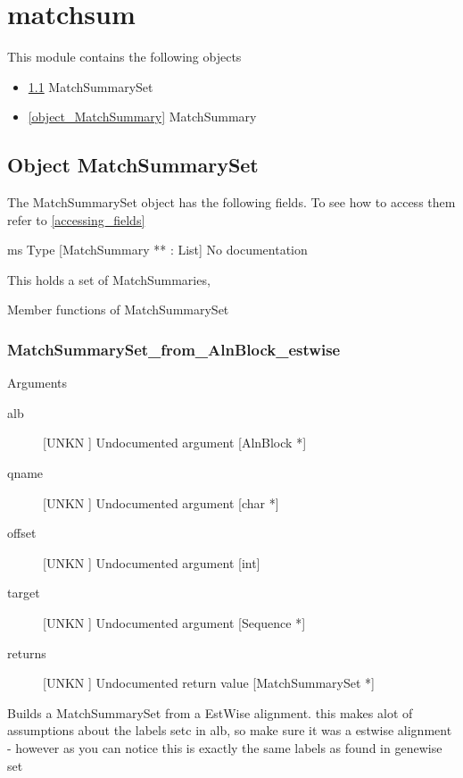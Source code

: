\section{matchsum}
\label{module_matchsum}
This module contains the following objects

\begin{itemize}
\item \ref{object_MatchSummarySet} MatchSummarySet

\item \ref{object_MatchSummary} MatchSummary

\end{itemize}
\subsection{Object MatchSummarySet}

\label{object_MatchSummarySet}

The MatchSummarySet object has the following fields. To see how to access them refer to \ref{accessing_fields}
\begin{description}
\item{ms} Type [MatchSummary ** : List] No documentation

\end{description}
This holds a set of MatchSummaries,




Member functions of MatchSummarySet

\subsubsection{MatchSummarySet_from_AlnBlock_estwise}

Arguments
\begin{description}
\item[alb] [UNKN ] Undocumented argument [AlnBlock *]
\item[qname] [UNKN ] Undocumented argument [char *]
\item[offset] [UNKN ] Undocumented argument [int]
\item[target] [UNKN ] Undocumented argument [Sequence *]
\item[returns] [UNKN ] Undocumented return value [MatchSummarySet *]
\end{description}
Builds a MatchSummarySet from a
EstWise alignment. this makes
alot of assumptions about the labels
setc in alb, so make sure it was a 
estwise alignment  - however as you
can notice this is exactly the same 
labels as found in genewise set


